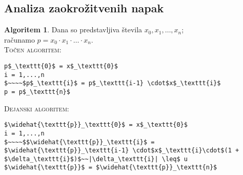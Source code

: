 \documentclass[11pt]{article}
\theoremstyle{definition}
\newtheorem*{algoritem}{Algoritem}
\begin{document}

\subsection{Analiza zaokrožitvenih napak}
\vspace{0.5cm}

\begin{algoritem}

Dana so predstavljiva števila $x_0, x_1, \ldots, x_n$; \\ računamo $p = x_0 \cdot x_1 \cdot \ldots \cdot x_n$. \\

\noindent \textsc{Točen algoritem}:
\begin{lstlisting}
p$_\texttt{0}$ = x$_\texttt{0}$
i = 1,...,n
$~~~~$p$_\texttt{i}$ = p$_\texttt{i-1} \cdot$x$_\texttt{i}$
p = p$_\texttt{n}$
\end{lstlisting} 

\noindent \textsc{Dejanski algoritem}:
\begin{lstlisting}
$\widehat{\texttt{p}}_\texttt{0}$ = x$_\texttt{0}$
i = 1,...,n
$~~~~$$\widehat{\texttt{p}}_\texttt{i}$ = $\widehat{\texttt{p}}_\texttt{i-1} \cdot$x$_\texttt{i}\cdot$(1 + $\delta_\texttt{i}$)$~~|\delta_\texttt{i}| \leq$ u
$\widehat{\texttt{p}}$ = $\widehat{\texttt{p}}_\texttt{n}$
\end{lstlisting}

\end{algoritem}
\vspace{0.5cm}
\end{document}
